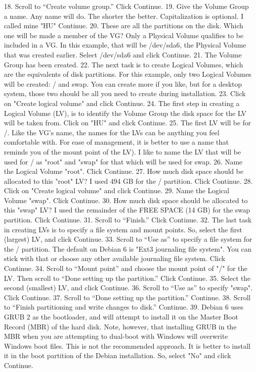 ﻿\documentclass[12pt]{article}
\begin{document}
18. Scroll to “Create volume group.” Click Continue. 
19. Give the Volume Group a name. Any name will do. The shorter the better. Capitalization is optional.  I called mine "HU" Continue. 
20. These are all the partitions on the disk. Which one will be made a member of the VG? Only a Physical Volume qualifies to be included in a VG. In this example, that will be /dev/sda6, the Physical Volume that was created earlier. Select /dev/sda6 and click Continue. 
21. The Volume Group has been created. 
22. The next task is to create Logical Volumes, which are the equivalents of disk partitions. For this example, only two Logical Volumes will be created: / and swap. You can create more if you like, but for a desktop system, those two should be all you need to create during installation. 
23. Click on "Create logical volume" and click Continue. 
24. The first step in creating a Logical Volume (LV), is to identify the Volume Group the disk space for the LV will be taken from. Click on "HU" and click Continue. 
25. The first LV will be for /. Like the VG’s name, the names for the LVs can be anything you feel comfortable with. For ease of management, it is better to use a name that reminds you of the mount point of the LV). I like to name the LV that will be used for / as "root" and "swap" for that which will be used for swap. 
26. Name the Logical Volume "root". Click Continue. 
27. How much disk space should be allocated to this "root" LV? I used 494 GB for the / partition. Click Continue. 
28. Click on "Create logical volume" and click Continue. 
29. Name the Logical Volume "swap". Click Continue. 
30. How much disk space should be allocated to this "swap" LV? I used the remainder of the FREE SPACE (14 GB) for the swap partition. Click Continue. 
31. Scroll to “Finish.” Click Continue. 
32. The last task in creating LVs is to specify a file system and mount points. So, select the first (largest) LV, and click Continue. 
33. Scroll to “Use as” to specify a file system for the / partition. The default on Debian 6 is "Ext3 journaling file system". You can stick with that or choose any other available journaling file system. Click Continue. 
34. Scroll to “Mount point” and choose the mount point of "/" for the LV. Then scroll to “Done setting up the partition.” Click Continue. 
35. Select the second (smallest) LV, and click Continue. 
36. Scroll to “Use as” to specify "swap". Click Continue. 
37. Scroll to “Done setting up the partition.” Continue. 
38. Scroll to “Finish partitioning and write changes to disk.” Continue. 
39. Debian 6 uses GRUB 2 as the bootloader, and will attempt to install it on the Master Boot Record (MBR) of the hard disk. Note, however, that installing GRUB in the MBR when you are attempting to dual-boot with Windows will overwrite Windows boot files. This is not the recommended approach. It is better to install it in the boot partition of the Debian installation. So, select "No" and click Continue. 
\end{document}
